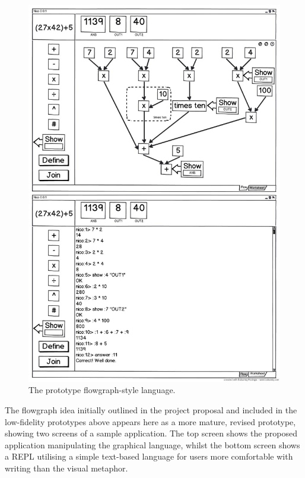 \documentclass[12pt,twoside,notitlepage,xetex]{report}
\begin{document}
\begin{figure}[H]
\begin{center}
\includegraphics[width=\textwidth-4cm]{figs/mockups/flowgraph/img/fg-000.jpg}
\caption{The prototype flowgraph-style language.}
\end{center}
\end{figure}

The flowgraph idea initially outlined in the project proposal and included in
the low-fidelity prototypes above appears here as a more mature, revised
prototype, showing two screens of a sample application.  The top screen shows
the proposed application manipulating the graphical language, whilst the bottom
screen shows a REPL utilising a simple text-based language for users more
comfortable with writing than the visual metaphor.
\end{document}
